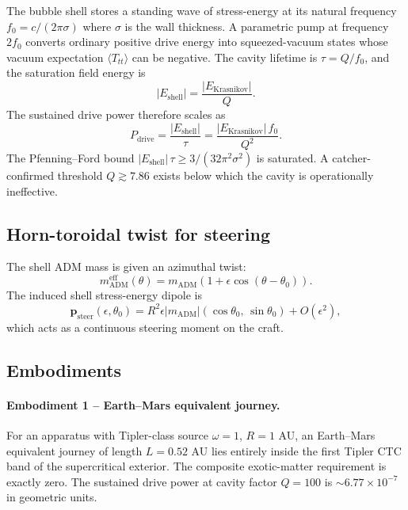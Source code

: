 \documentclass[11pt,a4paper]{article}
\begin{document}
The bubble shell stores a standing wave of stress-energy at its natural frequency $f_0 = c/(2\pi\sigma)$ where $\sigma$ is the wall thickness. A parametric pump at frequency $2 f_0$ converts ordinary positive drive energy into squeezed-vacuum states whose vacuum expectation $\langle T_{tt}\rangle$ can be negative. The cavity lifetime is $\tau = Q/f_0$, and the saturation field energy is
\begin{equation*}
|E_{\mathrm{shell}}| = \frac{|E_{\mathrm{Krasnikov}}|}{Q}.
\end{equation*}
The sustained drive power therefore scales as
\begin{equation*}
P_{\mathrm{drive}} = \frac{|E_{\mathrm{shell}}|}{\tau} = \frac{|E_{\mathrm{Krasnikov}}|\,f_0}{Q^2}.
\end{equation*}
The Pfenning--Ford bound $|E_{\mathrm{shell}}|\,\tau \ge 3 / (32\pi^2 \sigma^2)$ is saturated. A catcher-confirmed threshold $Q \gtrsim 7.86$ exists below which the cavity is operationally ineffective.

\subsection{Horn-toroidal twist for steering}

The shell ADM mass is given an azimuthal twist:
\begin{equation*}
m_{\mathrm{ADM}}^{\mathrm{eff}}(\theta) = m_{\mathrm{ADM}}(1 + \epsilon \cos(\theta - \theta_0)).
\end{equation*}
The induced shell stress-energy dipole is
\begin{equation*}
\bm{p}_{\mathrm{steer}}(\epsilon, \theta_0) = R^2 \epsilon |m_{\mathrm{ADM}}| (\cos\theta_0,\,\sin\theta_0) + O(\epsilon^2),
\end{equation*}
which acts as a continuous steering moment on the craft.

\subsection{Embodiments}

\paragraph{Embodiment 1 -- Earth--Mars equivalent journey.} For an apparatus with Tipler-class source $\omega = 1$, $R = 1$ AU, an Earth--Mars equivalent journey of length $L = 0.52$ AU lies entirely inside the first Tipler CTC band of the supercritical exterior. The composite exotic-matter requirement is exactly zero. The sustained drive power at cavity factor $Q = 100$ is $\sim 6.77 \times 10^{-7}$ in geometric units.
\end{document}
